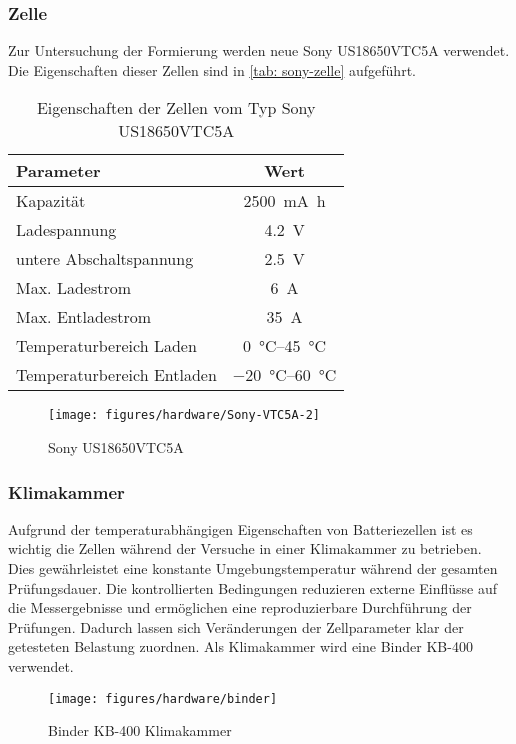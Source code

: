 \subsubsection{Zelle}
Zur Untersuchung der Formierung werden neue Sony US18650VTC5A verwendet.
Die Eigenschaften dieser Zellen sind in \autoref{tab: sony-zelle} aufgeführt.
\begin{table}[h]
    \centering
    \begin{tabular}{lc}
        \toprule
        Parameter & Wert \\
        \midrule
        Kapazität & \SI{2500}{\milli\ampere\hour} \\
        Ladespannung & \SI{4.2}{\volt} \\
        untere Abschaltspannung & \SI{2.5}{\volt} \\
        Max. Ladestrom & \SI{6}{\ampere} \\
        Max. Entladestrom & \SI{35}{\ampere} \\
        Temperaturbereich Laden & \SIrange{0}{45}{\celsius} \\
        Temperaturbereich Entladen & \SIrange{-20}{60}{\celsius} \\
        \bottomrule
    \end{tabular}
    \caption{Eigenschaften der Zellen vom Typ Sony US18650VTC5A}
    \label{tab: sony-zelle}
\end{table}

\begin{figure} [H]
    \centering
    \texttt{[image: figures/hardware/Sony-VTC5A-2]}
    \caption{Sony US18650VTC5A~\cite{sony_zelle}}
    \label{fig:sony-pic}
\end{figure}

\subsubsection{Klimakammer}
Aufgrund der temperaturabhängigen Eigenschaften von Batteriezellen ist es wichtig die Zellen während der Versuche
in einer Klimakammer zu betrieben.
Dies gewährleistet eine konstante Umgebungstemperatur während der gesamten Prüfungsdauer.
Die kontrollierten Bedingungen reduzieren externe Einflüsse auf die Messergebnisse und ermöglichen eine
reproduzierbare Durchführung der Prüfungen.
Dadurch lassen sich Veränderungen der Zellparameter klar der getesteten Belastung zuordnen.
Als Klimakammer wird eine Binder KB-400 verwendet.

\begin{figure} [H]
    \centering
    \texttt{[image: figures/hardware/binder]}
    \caption{Binder KB-400 Klimakammer~\cite{binder_kammer}}
    \label{fig:binder}
\end{figure}

